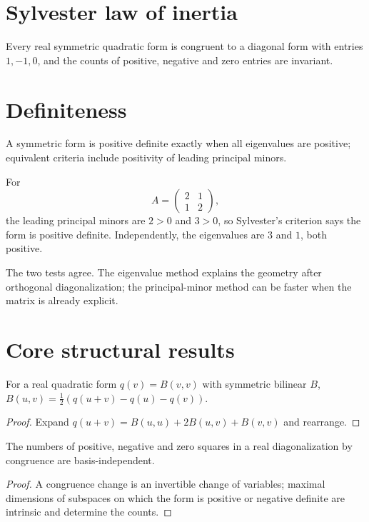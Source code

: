 \section{Sylvester law of inertia}
Every real symmetric quadratic form is congruent to a diagonal form with entries $1,-1,0$, and the counts of positive, negative and zero entries are invariant.

\section{Definiteness}
A symmetric form is positive definite exactly when all eigenvalues are positive; equivalent criteria include positivity of leading principal minors.


\begin{example}\label{ex:i17-expand-03}
For
\[
A=\begin{pmatrix}2&1\\1&2\end{pmatrix},
\]
the leading principal minors are \(2>0\) and \(3>0\), so Sylvester's criterion
says the form is positive definite. Independently, the eigenvalues are \(3\)
and \(1\), both positive.

The two tests agree. The eigenvalue method explains the geometry after
orthogonal diagonalization; the principal-minor method can be faster when the
matrix is already explicit.
\end{example}
\section{Core structural results}

\begin{theorem}\label{thm:i17-01}
For a real quadratic form $q(v)=B(v,v)$ with symmetric bilinear $B$, $B(u,v)=\frac12(q(u+v)-q(u)-q(v))$.
\begin{proof}
Expand $q(u+v)=B(u,u)+2B(u,v)+B(v,v)$ and rearrange.
\end{proof}
\end{theorem}

\begin{theorem}\label{thm:i17-02}
The numbers of positive, negative and zero squares in a real diagonalization by congruence are basis-independent.
\begin{proof}
A congruence change is an invertible change of variables; maximal dimensions of subspaces on which the form is positive or negative definite are intrinsic and determine the counts.
\end{proof}
\end{theorem}


